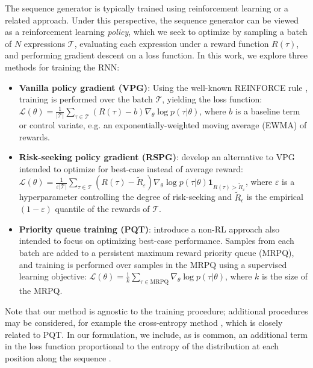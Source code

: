 \documentclass{article}
\begin{document}
The sequence generator is typically trained using reinforcement learning or a related approach.
Under this perspective, the sequence generator can be viewed as a reinforcement learning \textit{policy}, which we seek to optimize by sampling a batch of $N$ expressions $\mathcal{T}$, evaluating each expression under a reward function $R(\tau)$, and performing gradient descent on a loss function.
In this work, we explore three methods for training the RNN:
\begin{itemize}
    \item \textbf{Vanilla policy gradient (VPG)}: Using the well-known REINFORCE rule \citep{williams1992simple}, training is performed over the batch $\mathcal{T}$, yielding the loss function: $\mathcal{L}(\theta) = \frac{1}{|\mathcal{T}|}\sum_{\tau\in\mathcal{T}} (R(\tau)-b) \nabla_\theta \log p(\tau|\theta)$, where $b$ is a baseline term or control variate, e.g. an exponentially-weighted moving average (EWMA) of rewards.
    \item \textbf{Risk-seeking policy gradient (RSPG)}: \citet{petersen2019deep} develop an alternative to VPG intended to optimize for best-case instead of average reward: $\mathcal{L}(\theta) = \frac{1}{\varepsilon|\mathcal{T}|}\sum_{\tau\in\mathcal{T}} (R(\tau)-\tilde{R}_\varepsilon) \nabla_\theta \log p(\tau|\theta)\mathbf{1}_{R(\tau)>\tilde{R}_\varepsilon}$, where $\varepsilon$ is a hyperparameter controlling the degree of risk-seeking and $\tilde{R}_\epsilon$ is the empirical $(1-\varepsilon)$ quantile of the rewards of $\mathcal{T}$.
    \item \textbf{Priority queue training (PQT)}: \citet{abolafia2018neural} introduce a non-RL approach also intended to focus on optimizing best-case performance. Samples from each batch are added to a persistent maximum reward priority queue (MRPQ), and training is performed over samples in the MRPQ using a supervised learning objective: $\mathcal{L}(\theta) = \frac{1}{k}\sum_{\tau\in\textrm{MRPQ}}\nabla_\theta \log p(\tau|\theta)$, where $k$ is the size of the MRPQ.
\end{itemize}
Note that our method is agnostic to the training procedure; additional procedures may be considered, for example the cross-entropy method \citep{de2005tutorial}, which is closely related to PQT. In our formulation, we include, as is common, an additional term in the loss function proportional to the entropy of the distribution at each position along the sequence \citep{bello2016neural,abolafia2018neural,petersen2019deep,landajuela2021discovering}.
\end{document}

